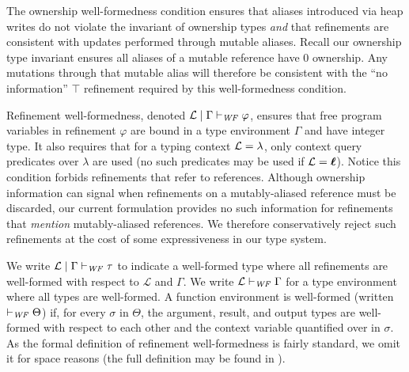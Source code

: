 The ownership well-formedness condition ensures that aliases introduced via
heap writes do not violate the invariant of ownership types \emph{and} that refinements
are consistent with updates performed through mutable aliases. Recall our ownership type invariant
ensures all aliases of a mutable reference have 0 ownership.
Any mutations through that mutable alias will therefore be consistent with the
``no information'' $ \top $ refinement required by this
well-formedness condition.

Refinement well-formedness, denoted $ \mathcal{L}   \mid   \Gamma   \vdash _{\mathit{WF}}  \varphi $,
ensures that free program variables in refinement $\varphi$ are
bound in a type environment $\Gamma$ and have integer type. It
also requires that for a typing context
$\mathcal{L}  =  \lambda$, only context query predicates over $\lambda$ are used (no such
predicates may be used if $\mathcal{L}  \ottsym{=}  \oldvec{\ell}$). Notice this condition
forbids refinements that refer to references. Although
ownership information can signal when refinements on a mutably-aliased
reference must be discarded, our current formulation
provides no such information for refinements that \emph{mention}
mutably-aliased references. We therefore conservatively reject
such refinements at the cost of some expressiveness in our type system.

We write $ \mathcal{L}   \mid   \Gamma   \vdash _{\mathit{WF}}  \tau $ to indicate a well-formed type where
all refinements are well-formed with respect to $\mathcal{L}$ and $\Gamma$.
We write $ \mathcal{L}   \vdash _{\mathit{WF}}  \Gamma $ for a type environment where all
types are well-formed. A function environment
is well-formed (written $ \vdash _{\mathit{WF}}  \Theta $) if, for every $\sigma$ in $\Theta$,
the argument, result, and output types are well-formed with respect
to each other and the context variable quantified over in $\sigma$.
As the formal definition of refinement well-formedness is fairly standard, we
omit it for space reasons (the full definition may be found in ).

